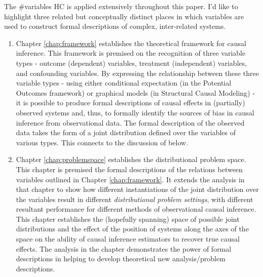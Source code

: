 \documentclass[./main.tex]{subfiles}
\begin{document}
The \#variables HC is applied extensively throughout this paper. I'd like to highlight three related but conceptually distinct places in which variables are used to construct formal descriptions of complex, inter-related systems.

\begin{enumerate}
    \item Chapter \ref{chap:framework} establishes the theoretical framework for causal inference. This framework is premised on the recognition of three variable types - outcome (dependent) variables, treatment (independent) variables, and confounding variables. By expressing the relationship between these three variable types - using either conditional expectation (in the Potential Outcomes framework) or graphical models (in Structural Causal Modeling) - it is possible to produce formal descriptions of causal effects in (partially) observed systems and, thus, to formally identify the sources of bias in causal inference from observational data. The formal description of the observed data takes the form of a joint distribution defined over the variables of various types. This connects to the discussion of  below.
    
    \item Chapter \ref{chap:problemspace} establishes the distributional problem space. This chapter is premised the formal descriptions of the relations between variables outlined in Chapter \ref{chap:framework}. It extends the analysis in that chapter to show how different instantiations of the joint distribution over the variables result in different \textit{distributional problem settings}, with different resultant performance for different methods of observational causal inference. This chapter establishes the (hopefully spanning) space of possible joint distributions and the effect of the position of systems along the axes of the space on the ability of causal inference estimators to recover true causal effects. The analysis in the chapter demonstrates the power of formal descriptions in helping to develop theoretical new analysis/problem descriptions.
    

\end{enumerate}
\end{document}
